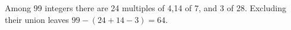 Among 99 integers there are 24 multiples of 4,14 of 7, and 3 of 28. Excluding their union leaves $99-(24+14-3)=\boxed{64}$.
